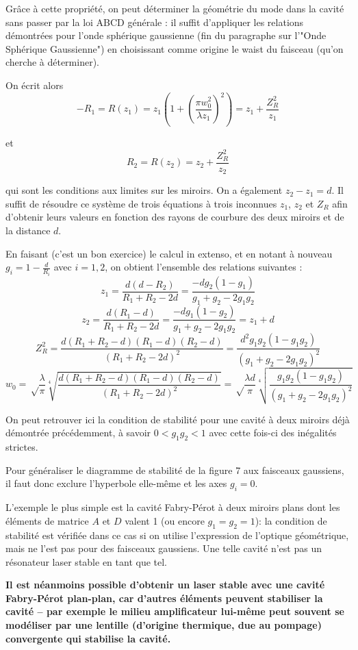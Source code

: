 \documentclass{book}
\begin{document}
Grâce à cette propriété, on peut déterminer la géométrie du mode dans la cavité sans passer par la loi ABCD générale : il suffit d'appliquer les relations démontrées pour l'onde sphérique gaussienne (fin du paragraphe sur l'"Onde Sphérique Gaussienne") en choisissant comme origine le waist du faisceau (qu'on cherche à déterminer).

On écrit alors
\[-R_1=R(z_1)=z_1\left(1+\left(\frac{\pi w_0^2}{\lambda z_1}\right)^2\right)=z_1+\frac{Z_R^2}{z_1}\]

et
\[R_2 = R(z_2) = z_2+\frac{Z_R^2}{z_2}\]

qui sont les conditions aux limites sur les miroirs. On a également \(z_2-z_1=d\). Il suffit de résoudre ce système de trois équations à trois inconnues \(z_1\), \(z_2\) et \(Z_R\) afin d'obtenir leurs valeurs en fonction des rayons de courbure des deux miroirs et de la distance \(d\).

En faisant (c'est un bon exercice) le calcul in extenso, et en notant à nouveau \(g_i=1-\frac d{R_i}\) avec \(i=1, 2\), on obtient l'ensemble des relations suivantes :
\[z_1 = \frac{d(d-R_2)}{R_1+R_2-2d} = \frac{-dg_2(1-g_1)}{g_1+g_2-2g_1g_2}\]
\[z_2 = \frac{d(R_1-d)}{R_1+R_2-2d} = \frac{-dg_1(1-g_2)}{g_1+g_2-2g_1g_2}=z_1+d\]
\[Z_R^2 = \frac {d(R_1+R_2-d)(R_1-d)(R_2-d)}{(R_1+R_2-2d)^2}=\frac {d^2g_1g_2(1-g_1g_2)}{(g_1+g_2-2g_1g_2)^2}\]
\[w_0 = \sqrt \frac \lambda \pi \sqrt[4]{\frac {d(R_1+R_2-d)(R_1-d)(R_2-d)}{(R_1+R_2-2d)^2}}=\sqrt \frac{\lambda
d}\pi \sqrt[4]{\frac {g_1g_2(1-g_1g_2)}{(g_1+g_2-2g_1g_2)^2}}\]

On peut retrouver ici la condition de stabilité pour une cavité à deux miroirs déjà démontrée précédemment, à savoir \(0 < g_1g_2 < 1\) avec cette fois-ci des inégalités strictes.

Pour généraliser le diagramme de stabilité de la figure 7 aux faisceaux gaussiens, il faut donc exclure l'hyperbole elle-même et les axes \(g_i = 0\).

L'exemple le plus simple est la cavité Fabry-Pérot à deux miroirs plans dont les éléments de matrice \(A\) et \(D\)
valent 1 (ou encore \(g_1 = g_2 = 1\)): la condition de stabilité est vérifiée dans ce cas si on utilise l'expression de l'optique géométrique, mais ne l'est pas pour des faisceaux gaussiens. Une telle cavité n'est pas un résonateur laser stable en tant que tel.

\textbf{\color{red}Il est néanmoins possible d'obtenir un laser stable avec une cavité Fabry-Pérot plan-plan, car d'autres éléments peuvent stabiliser la cavité – par exemple le milieu amplificateur lui-même peut souvent se modéliser par une lentille (d'origine thermique, due au pompage) convergente qui stabilise la cavité.}
\end{document}
